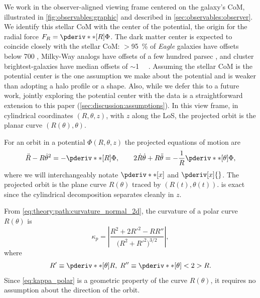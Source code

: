 \documentclass[linenumbers,twocolumn]{aastex701}
\newcommand{\curvature}{\kappa}  %
\newcommand{\proj}[1]{{#1}_{p}}  %
\newcommand{\curvaturesky}{\proj{\curvature}}  %
\begin{document}
    We work in the observer-aligned viewing frame centered on the galaxy's \gls{CoM}, illustrated in \autoref{fig:observables:graphic} and described in \autoref{sec:observables:observer}. %
    We identify this stellar \gls{CoM} with the center of the potential, the origin for the radial force $F_R = \pderiv**[R]{\Phi}$. %
    The dark matter center is expected to coincide closely with the stellar \gls{CoM}: $>$\qty{95}{\percent}  of \emph{Eagle} galaxies have offsets below \qty{700}{\parsec} \citep{Schaller+:2015:OffsetsGalaxiesTheir}, Milky-Way analogs have offsets of a few hundred parsec \citep{Kuhlen+:2013:OFFCENTERDENSITYPEAK}, and cluster brightest-galaxies have median offsets of $\sim$\qty{1}{\kilo\parsec} \citep{Roche+:2024:BrightestClusterGalaxy}. %
    Assuming the stellar \gls{CoM} is the potential center is the one assumption we make about the potential and is weaker than adopting a halo profile or a shape. %
    Also, while we defer this to a future work, jointly exploring the potential center with the data is a straightforward extension to this paper (\autoref{sec:discussion:assumptions}). %
    In this view frame, in cylindrical coordinates $(R, \theta, z)$, with $z$ along the \gls{LoS}, the projected orbit is the planar curve $(R(\theta), \theta)$. %

    For an orbit in a potential $\Phi(R,\theta,z)$ the projected equations of motion are
    \begin{equation} \label{eq:theory:potential_convexities:eom}
        \ddot{R} - R\dot{\theta}^2 = -\pderiv**[R]{\Phi}, \qquad
        2\dot{R}\dot{\theta} + R\ddot{\theta} = -\frac{1}{R}\pderiv**[\theta]{\Phi},
    \end{equation}
    where we will interchangeably notate $\pderiv**[x]{}$ and $\pderiv[x]{}$.
    The projected orbit is the plane curve $R(\theta)$ traced by $(R(t), \theta(t))$. %
     is exact since the cylindrical
    decomposition separates cleanly in $z$. %

    From \cref{eq:theory:path:curvature_normal_2d}, the curvature of a polar curve $R(\theta)$ is %
    \begin{equation} \label{eq:kappa_polar}
      \curvaturesky = \left| \frac{R^2 + 2R'^2 - R R''}
                       {\bigl(R^2 + R'^2\bigr)^{3/2}} \right|,
    \end{equation}
    where
    \begin{equation}
        R' \equiv \pderiv**[\theta]{R}, \; R'' \equiv \pderiv**[\theta]<2>{R}. %
    \end{equation}
    Since \cref{eq:kappa_polar} is a geometric property of the curve $R(\theta)$, it requires no assumption about the direction of the orbit. %
\end{document}
